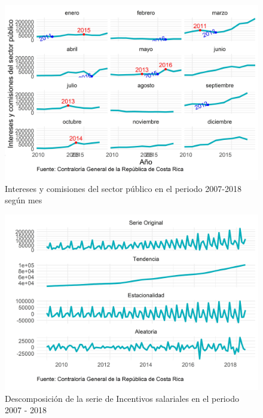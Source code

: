 \documentclass[
]{article}
\begin{document}
\begin{figure}[H]
\includegraphics[width=1\linewidth,height=1\textheight]{Tesis_files/figure-latex/interesesplotperiodos-1} \caption{Intereses y comisiones del sector público en el periodo 2007-2018 según mes}\label{fig:interesesplotperiodos}
\end{figure}

\begin{figure}[H]
\includegraphics[width=1\linewidth,height=1\textheight]{Tesis_files/figure-latex/interesesplotdescomposicion-1} \caption{Descomposición de la serie de Incentivos salariales en el periodo 2007 - 2018}\label{fig:interesesplotdescomposicion}
\end{figure}
\end{document}
